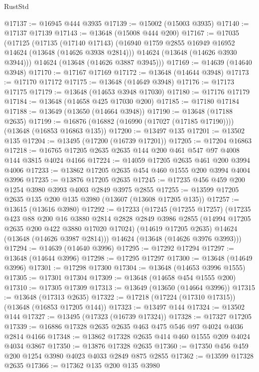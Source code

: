 \begin{lexlean}{RustStd}
\begin{coremodule}
@17137 := @16945 @444 @3935
@17139 := @15002 (@15003 @3935)
@17140 := @17137 @17139
@17143 := @13648 (@15008 @444 @200)
@17167 := @17035
    (@17125
      (@17135
        (@17140 @17143)
        (@16940 @1759 @2855 @16949 @16952 @14624 (@13648 (@14626 @3938 @2814)))
        @14624
        (@13648 (@14626 @3930 @3944)))
      @14624
      (@13648 (@14626 @3887 @3945)))
@17169 := @14639 (@14640 @3948)
@17170 := @17167 @17169
@17172 := @13648 (@14644 @3948)
@17173 := @17170 @17172
@17175 := @13648 (@14649 @3948)
@17176 := @17173 @17175
@17179 := @13648 (@14653 @3948 @17030)
@17180 := @17176 @17179
@17184 := @13648 (@14658 @425 @17030 @200)
@17185 := @17180 @17184
@17188 := @13649 (@13650 (@14664 @3948))
@17190 := @13648 (@17188 @2635)
@17199 := @16876 (@16882 (@16990 (@17027 (@17185 @17190)))) (@13648 (@16853 @16863 @135))
@17200 := @13497 @135
@17201 := @13502 @135
@17204 := @13495 (@17200 (@16739 @17201))
@17205 := @17204 @16863
@17218 := @16765 @17205 @2635 @2635 @144 @200 @461 @547 @97 @4008 @144 @3815 @4024 @4166
@17224 := @14059 @17205 @2635 @461 @200 @3994 @4006
@17233 := @13862 @17205 @2635 @454 @460 @1555 @200 @3994 @4004 @3996
@17235 := @13876 @17205 @2635
@17245 := @17235 @456 @459 @200 @1254 @3980 @3993 @4003 @2849 @3975 @2855
@17255 := @13599 @17205 @2635 @135 @200 @135 @3980 (@13607 (@13608 @17205 @135))
@17257 := @13615 (@13616 @3980)
@17292 := @17233
    (@17245
      (@17255 @17257)
      (@17235
        @423
        @88
        @200
        @16
        @3880
        @2814
        @2828
        @2849
        @3986
        @2855
        (@14994 @17205 @2635 @200 @422 @3880 @17020 @17024)
        (@14619 @17205 @2635)
        @14624
        (@13648 (@14626 @3987 @2814)))
      @14624
      (@13648 (@14626 @3976 @3993)))
@17294 := @14639 (@14640 @3996)
@17295 := @17292 @17294
@17297 := @13648 (@14644 @3996)
@17298 := @17295 @17297
@17300 := @13648 (@14649 @3996)
@17301 := @17298 @17300
@17304 := @13648 (@14653 @3996 @1555)
@17305 := @17301 @17304
@17309 := @13648 (@14658 @454 @1555 @200)
@17310 := @17305 @17309
@17313 := @13649 (@13650 (@14664 @3996))
@17315 := @13648 (@17313 @2635)
@17322 := @17218 (@17224 (@17310 @17315)) (@13648 (@16853 @17205 @144))
@17323 := @13497 @144
@17324 := @13502 @144
@17327 := @13495 (@17323 (@16739 @17324))
@17328 := @17327 @17205
@17339 := @16886 @17328 @2635 @2635 @463 @475 @546 @97 @4024 @4036 @2814 @4166
@17348 := @13862 @17328 @2635 @414 @460 @1555 @209 @4024 @4034 @3867
@17350 := @13876 @17328 @2635
@17360 := @17350 @456 @459 @200 @1254 @3980 @4023 @4033 @2849 @875 @2855
@17362 := @13599 @17328 @2635
@17366 := @17362 @135 @200 @135 @3980

\end{coremodule}
\end{lexlean}
